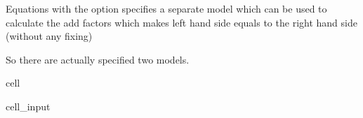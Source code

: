 \documentclass[letterpaper,10pt,english]{jupyterBook}
\begin{document}
\sphinxAtStartPar
Equations with the option  specifies a separate model which can be used to calculate the add factors
which makes left hand side equals to the right hand side (without any fixing)

\sphinxAtStartPar
So there are actually specified two models.

\begin{sphinxuseclass}{cell}\begin{sphinxVerbatimInput}

\begin{sphinxuseclass}{cell_input}
\begin{sphinxVerbatim}[commandchars=\\\{\}]
\end{sphinxVerbatim}

\end{sphinxuseclass}\end{sphinxVerbatimInput}
\begin{sphinxVerbatimOutput}


\end{sphinxVerbatimOutput}
\end{sphinxuseclass}
\end{document}
